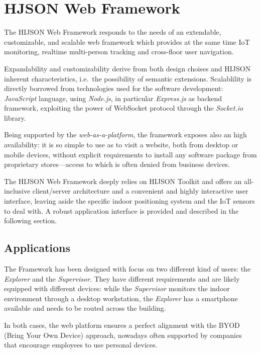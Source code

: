 \section{HJSON Web Framework}\label{hjson-web-framework}

The HIJSON Web Framework responds to the needs of an extendable,
customizable, and scalable web framework which provides at the same time IoT
monitoring, realtime multi-person tracking and cross-floor user
navigation.

Expandability and customizability derive from both design choises and
HIJSON inherent characteristics, i.e.~the possibility of semantic extensions.
Scalablility is directly borrowed from technologies used for the
software development: \emph{JavaScript} language, using \emph{Node.js},
in particular \emph{Express.js} as backend framework, exploiting the
power of WebSocket protocol through the \emph{Socket.io} library.

Being supported by the \emph{web-as-a-platform}, the framework exposes
also an high availability: it is so simple to use as to visit a
website, both from desktop or mobile devices, without explicit
requirements to install any software package from proprietary stores---access to
which is often denied from business devices.

The HIJSON Web Framework deeply relies on HIJSON Toolkit and offers an
all-inclusive client/server architecture and a convenient and highly interactive
user interface, leaving aside the specific indoor positioning system and
the IoT sensors to deal with. A robust application interface is provided and
described in the following section.

\subsection{Applications}\label{applications}

The Framework has been designed with focus on two different kind of
users: the \emph{Explorer} and the \emph{Supervisor}. They have
different requirements and are likely equipped with different devices:
while the \emph{Supervisor} monitors the indoor environment through a
desktop workstation, the \emph{Explorer} has a smartphone available and
needs to be routed across the building.

In both cases, the web platform ensures a perfect alignment with the
BYOD (Bring Your Own Device) approach, nowadays often supported by companies
that encourage employees to use personal devices.

